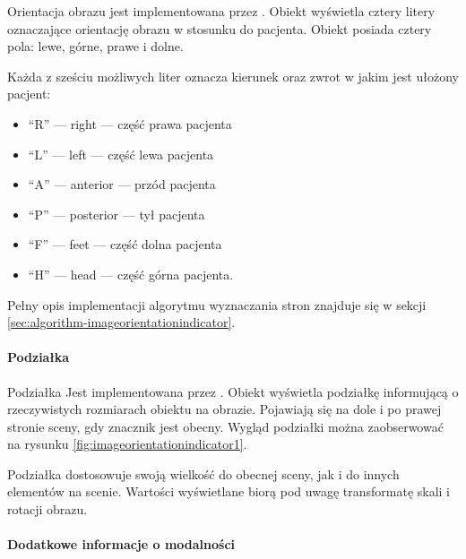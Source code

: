 \par
Orientacja obrazu jest implementowana przez .
Obiekt wyświetla cztery litery oznaczające orientację obrazu w stosunku do pacjenta.
Obiekt posiada cztery pola: lewe, górne, prawe i dolne.

\par
Każda z sześciu możliwych liter oznacza kierunek oraz zwrot w jakim jest ułożony pacjent:
\begin{itemize}
    \item \enquote{R} --- right --- część prawa pacjenta
    \item \enquote{L} --- left --- część lewa pacjenta
    \item \enquote{A} --- anterior --- przód pacjenta
    \item \enquote{P} --- posterior --- tył pacjenta
    \item \enquote{F} --- feet --- część dolna pacjenta
    \item \enquote{H} --- head --- część górna pacjenta.
\end{itemize}

\par
Pełny opis implementacji algorytmu wyznaczania stron znajduje się w sekcji \ref{sec:algorithm-imageorientationindicator}.

\paragraph{Podziałka}

Podziałka Jest implementowana przez .
Obiekt wyświetla podziałkę informującą o rzeczywistych rozmiarach obiektu na obrazie.
Pojawiają się na dole i po prawej stronie sceny, gdy znacznik  jest obecny.
Wygląd podziałki można zaobserwować na rysunku \ref{fig:imageorientationindicator1}.

Podziałka dostosowuje swoją wielkość do obecnej sceny, jak i do innych elementów na scenie.
Wartości wyświetlane biorą pod uwagę transformatę skali i rotacji obrazu.

\paragraph{Dodatkowe informacje o modalności}

